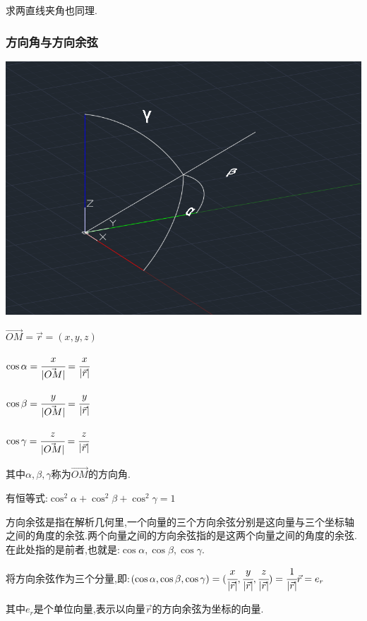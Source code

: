 \documentclass[UTF8,12pt]{ctexbook}
\begin{document}
{{{{\begin{itemize}
{              求两直线夹角也同理.
              }
      \end{itemize}
    }%

    \subsubsection{方向角与方向余弦}{
      \includegraphics[scale = 0.5]{resources/directionAngle.png}

      $\vec{OM} = \vec{r} = (x,y,z)$

      $\cos\alpha = \cfrac{x}{|\vec{OM}|} = \cfrac{x}{|\vec{r}|}$

      $\cos\beta = \cfrac{y}{|\vec{OM}|} = \cfrac{y}{|\vec{r}|}$

      $\cos\gamma = \cfrac{z}{|\vec{OM}|} = \cfrac{z}{|\vec{r}|}$

      其中$\alpha,\beta,\gamma$称为$\vec{OM}$的方向角.

      有恒等式:$\cos^2\alpha + \cos^2\beta + \cos^2\gamma = 1$

      方向余弦是指在解析几何里,一个向量的三个方向余弦分别是这向量与三个坐标轴之间的角度的余弦.两个向量之间的方向余弦指的是这两个向量之间的角度的余弦.在此处指的是前者,也就是:$\cos\alpha,\cos\beta,\cos\gamma$.

      将方向余弦作为三个分量,即:$(\cos\alpha,\cos\beta,\cos\gamma) = (\cfrac{x}{|\vec{r}|}, \cfrac{y}{|\vec{r}|}, \cfrac{z}{|\vec{r}|}) = \cfrac{1}{|\vec{r}|}\vec{r} = e_r$

      其中$e_r$是个单位向量,表示以向量$\vec{r}$的方向余弦为坐标的向量.

    }%

}}}
\end{document}
